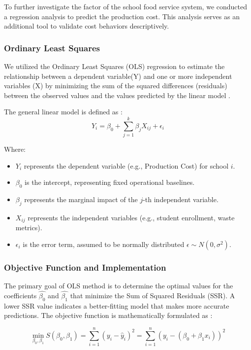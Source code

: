 \documentclass{scrartcl}
\begin{document}
To further investigate the factor of the school food service system, we conducted a regression analysis to predict the production cost. This analysis serves as an additional tool to validate cost behaviors descriptively.

\subsubsection{Ordinary Least Squares}

We utilized the Ordinary Least Squares (OLS) regression to estimate the relationship between a dependent variable(Y) and one or more independent variables (X) by minimizing the sum of the squared differences (residuals) between the observed values and the values predicted by the linear model \cite{Wooditch2021}.

The general linear model is defined as \cite{james2021ISL}:
\begin{equation}
    Y_i = \beta_0 + \sum^k_{j=1}\beta_jX_{ij}+\epsilon_i
\end{equation}

Where:
\begin{itemize}
    \item $Y_i$ represents the dependent variable (e.g., Production Cost) for school $i$.
    \item $\beta_0$ is the intercept, representing fixed operational baselines.
    \item $\beta_j$ represents the marginal impact of the $j$-th independent variable.
    \item $X_{ij}$ represents the independent variables (e.g., student enrollment, waste metrics).
    \item $\epsilon_i$ is the error term, assumed to be normally distributed $\epsilon \sim N(0, \sigma^2)$.
\end{itemize}

\subsubsection{Objective Function and Implementation}

The primary goal of OLS method is to determine the optimal values for the coefficients $\hat{\beta_0}$ and $\hat{\beta_1}$ that minimize the Sum of Squared Residuals (SSR). A lower SSR value indicates a better-fitting model that makes more accurate predictions. The objective function is mathematically formulated as \cite{jameslr}:

\begin{equation}
    \min_{\beta_0, \beta_1} S(\beta_0, \beta_1) = \sum_{i=1}^{n} (y_i - \hat{y}_i)^2 = \sum_{i=1}^{n} (y_i - (\beta_0 + \beta_1 x_i))^2
    \label{eq:ols_obj}
\end{equation}
\end{document}
